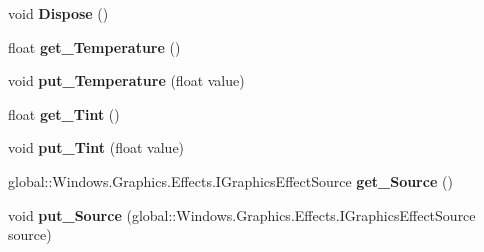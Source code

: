 \begin{DoxyCompactItemize}
\mbox{\label{class_microsoft_1_1_graphics_1_1_canvas_1_1_effects_1_1_temperature_and_tint_effect_a031064924b7d131d2cb24fc23669ef2f}} 
void {\bfseries Dispose} ()
\item 
\mbox{\label{class_microsoft_1_1_graphics_1_1_canvas_1_1_effects_1_1_temperature_and_tint_effect_a28db1ed9968ed328d9fc6bfe5b631a3c}} 
float {\bfseries get\+\_\+\+Temperature} ()
\item 
\mbox{\label{class_microsoft_1_1_graphics_1_1_canvas_1_1_effects_1_1_temperature_and_tint_effect_adb69589a791103c1ccc70be5fd283801}} 
void {\bfseries put\+\_\+\+Temperature} (float value)
\item 
\mbox{\label{class_microsoft_1_1_graphics_1_1_canvas_1_1_effects_1_1_temperature_and_tint_effect_a59625010f53353aeadc357e732f4b316}} 
float {\bfseries get\+\_\+\+Tint} ()
\item 
\mbox{\label{class_microsoft_1_1_graphics_1_1_canvas_1_1_effects_1_1_temperature_and_tint_effect_ac84f3870c687f56f7b661e60a685bac4}} 
void {\bfseries put\+\_\+\+Tint} (float value)
\item 
\mbox{\label{class_microsoft_1_1_graphics_1_1_canvas_1_1_effects_1_1_temperature_and_tint_effect_abbabd3d602c1135a09f9a6cb9f205e51}} 
global\+::\+Windows.\+Graphics.\+Effects.\+I\+Graphics\+Effect\+Source {\bfseries get\+\_\+\+Source} ()
\item 
\mbox{\label{class_microsoft_1_1_graphics_1_1_canvas_1_1_effects_1_1_temperature_and_tint_effect_a72294e2088f294cc1c29ae174184bafd}} 
void {\bfseries put\+\_\+\+Source} (global\+::\+Windows.\+Graphics.\+Effects.\+I\+Graphics\+Effect\+Source source)
\item 

\end{DoxyCompactItemize}
